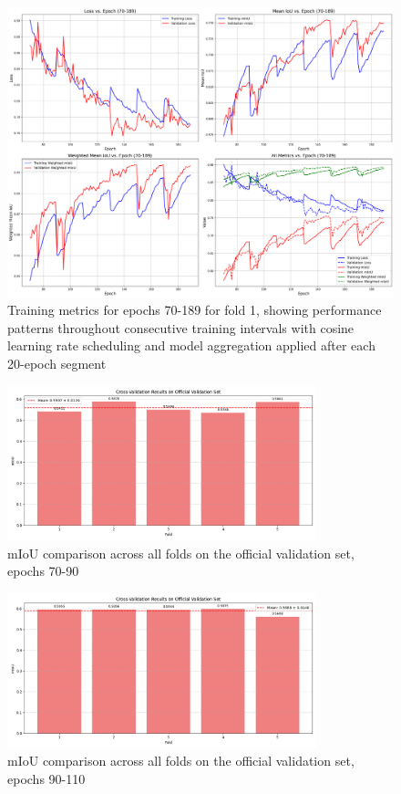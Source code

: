 \documentclass[]{article}
\begin{document}
\begin{figure}[htbp]
    \centering
    \includegraphics[width=1.0\textwidth]{../outputs/deeplabv3plus_test_results/late_training_epochs_70_to_189.png}
		\caption{Training metrics for epochs 70-189 for fold 1, showing performance patterns throughout consecutive training intervals with cosine learning rate scheduling and model aggregation applied after each 20-epoch segment}
    \label{fig:train_metrics_70_189}
\end{figure}

\begin{figure}[htbp]
		\centering
		\includegraphics[width=0.8\textwidth]{figures/folds_70_90.png}
		\caption{mIoU comparison across all folds on the official validation set, epochs 70-90}
		\label{fig:cross_val_70_90_val}
\end{figure}

\begin{figure}[htbp]
		\centering
		\includegraphics[width=0.8\textwidth]{figures/folds_90_110.png}
		\caption{mIoU comparison across all folds on the official validation set, epochs 90-110}
		\label{fig:cross_val_90_110_val}
\end{figure}
\end{document}

